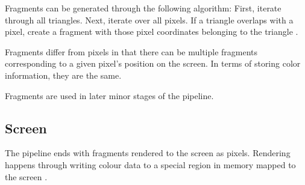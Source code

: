 Fragments can be generated through the following algorithm:
First, iterate through all triangles. Next, iterate over all pixels.
If a triangle overlaps with a pixel, create a fragment with those pixel
coordinates belonging to the triangle \cite{scratchapixelRasterization}.

Fragments differ from pixels in that there can be multiple fragments corresponding
to a given pixel's position on the screen. In terms of storing color information,
they are the same.

Fragments are used in later minor stages of the pipeline.

\subsection{Screen}
The pipeline ends with fragments rendered to the screen as pixels.
Rendering happens through writing colour data to a special region in memory
mapped to the screen \cite{crow2004evolution}.


